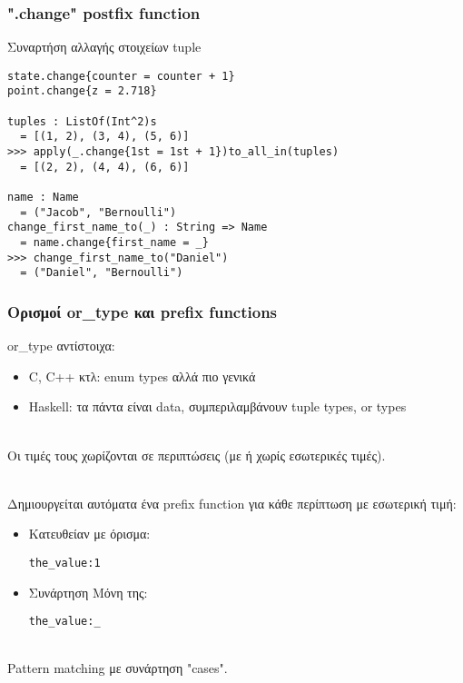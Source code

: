 \documentclass{beamer}
\def\e{\foreignlanguage{english}}
\def\h{\e{Haskell}}
\begin{document}
\begin{frame}[fragile]

\frametitle{\e{".change" postfix function}}

Συναρτήση αλλαγής στοιχείων \e{tuple}

\begin{otherlanguage}{english}
\begin{verbatim}
state.change{counter = counter + 1}
point.change{z = 2.718}

tuples : ListOf(Int^2)s
  = [(1, 2), (3, 4), (5, 6)]
>>> apply(_.change{1st = 1st + 1})to_all_in(tuples)
  = [(2, 2), (4, 4), (6, 6)]

name : Name
  = ("Jacob", "Bernoulli")
change_first_name_to(_) : String => Name
  = name.change{first_name = _}
>>> change_first_name_to("Daniel")
  = ("Daniel", "Bernoulli")
\end{verbatim}
\end{otherlanguage}

\end{frame}

\begin{frame}[fragile]

\frametitle{Ορισμοί \e{or\_type} και \e{prefix functions}}

\e{or\_type} αντίστοιχα:

\begin{itemize}

\item \e{C, C++} κτλ: \e{enum types} αλλά πιο γενικά

\item \h:
τα πάντα είναι \e{data}, συμπεριλαμβάνουν \e{tuple types}, \e{or types}
\\~\

\end{itemize}

Οι τιμές τους χωρίζονται σε περιπτώσεις (με ή χωρίς εσωτερικές τιμές).
\\~\

Δημιουργείται αυτόματα ένα \e{prefix function} για κάθε περίπτωση με εσωτερική
τιμή:

\begin{itemize}

\item Κατευθείαν με όρισμα:
\begin{otherlanguage}{english}
\verb|the_value:1|
\end{otherlanguage}

\item Συνάρτηση Μόνη της:
\begin{otherlanguage}{english}
\verb|the_value:_|
\\~\
\end{otherlanguage}

\end{itemize}
\e{Pattern matching} με συνάρτηση \e{"cases"}.

\end{frame}
\end{document}

